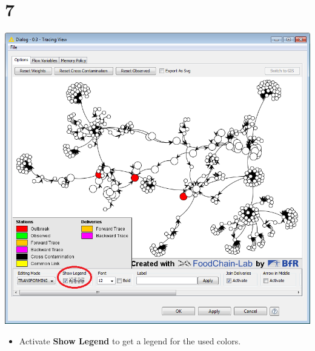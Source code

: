 \documentclass{beamer}
\begin{document}
\section{7}
\begin{frame}
	\begin{center}
  		\includegraphics[height=0.6\textheight]{7.png}
	\end{center}
	\begin{itemize}
		\item Activate \textbf{Show Legend} to get a legend for the used colors.
	\end{itemize}
\end{frame}
\end{document}
